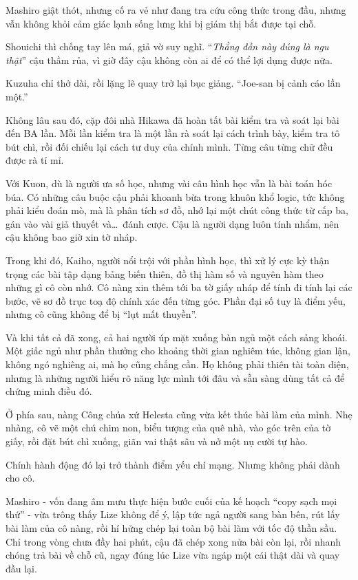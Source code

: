 \documentclass[../main.tex]{subfiles}
\begin{document}
Mashiro giật thót, nhưng cố ra vẻ như đang tra cứu công thức trong đầu, nhưng vẫn không khỏi cảm giác lạnh sống lưng khi bị giám thị bắt được tại chỗ.

Shouichi thì chống tay lên má, giả vờ suy nghĩ. ``\textit{Thằng đần này đúng là ngu thật}'' cậu thầm rủa, vì giờ đây cậu không còn ai để có thể lợi dụng được nữa.

Kuzuha chỉ thở dài, rồi lặng lẽ quay trở lại bục giảng. ``Joe-san bị cảnh cáo lần một.''

\ct

Không lâu sau đó, cặp đôi nhà Hikawa đã hoàn tất bài kiểm tra và soát lại bài đến BA lần. Mỗi lần kiểm tra là một lần rà soát lại cách trình bày, kiểm tra tô bút chì, rồi đối chiếu lại cách tư duy của chính mình. Từng câu từng chữ đều được rà tỉ mỉ.

Với Kuon, dù là người ưa số học, nhưng vài câu hình học vẫn là bài toán hóc búa. Có những câu buộc cậu phải khoanh bừa trong khuôn khổ logic, tức không phải kiểu đoán mò, mà là phân tích sơ đồ, nhớ lại một chút công thức từ cấp ba, gán vào vài giả thuyết và\dots\ đánh cược. Cậu là người dạng luôn tính nhẩm, nên cậu không bao giờ xin tờ nháp.

Trong khi đó, Kaiho, người nổi trội với phần hình học, thì xử lý cực kỳ thận trọng các bài tập dạng bảng biến thiên, đồ thị hàm số và nguyên hàm theo những gì cô còn nhớ. Cô nàng xin thêm tới ba tờ giấy nháp để tính đi tính lại các bước, vẽ sơ đồ trục toạ độ chính xác đến từng góc. Phần đại số tuy là điểm yếu, nhưng cô cũng không để bị ``lụt mất thuyền''.

Và khi tất cả đã xong, cả hai người úp mặt xuống bàn ngủ một cách sảng khoái. Một giấc ngủ như phần thưởng cho khoảng thời gian nghiêm túc, không gian lận, không ngó nghiêng ai, mà họ cũng chẳng cần. Họ không phải thiên tài toàn diện, nhưng là những người hiểu rõ năng lực mình tới đâu và sẵn sàng dùng tất cả để chứng minh điều đó.

Ở phía sau, nàng Công chúa xứ Helesta cũng vừa kết thúc bài làm của mình. Nhẹ nhàng, cô vẽ một chú chim non, biểu tượng của quê nhà, vào góc trên của tờ giấy, rồi đặt bút chì xuống, giãn vai thật sâu và nở một nụ cười tự hào.


Chính hành động đó lại trở thành điểm yếu chí mạng. Nhưng không phải dành cho cô.

Mashiro - vốn đang âm mưu thực hiện bước cuối của kế hoạch ``copy sạch mọi thứ'' - vừa trông thấy Lize không để ý, lập tức ngả người sang bàn bên, rút lấy bài làm của cô nàng, rồi hí hửng chép lại toàn bộ bài làm với tốc độ thần sầu. Chỉ trong vòng chưa đầy hai phút, cậu đã chép xong nửa bài còn lại, rồi nhanh chóng trả bài về chỗ cũ, ngay đúng lúc Lize vừa ngáp một cái thật dài và quay đầu lại.
\end{document}
